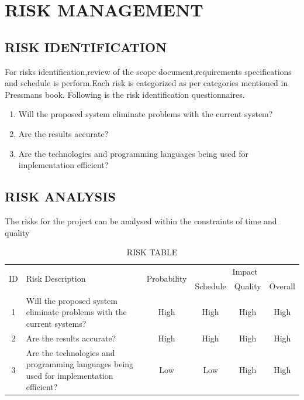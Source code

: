 \documentclass[oneside,a4paper,12pt]{report}
\begin{document}
\section{RISK MANAGEMENT}
\subsection{RISK IDENTIFICATION}
For risks identification,review of the scope document,requirements specifications and schedule is perform.Each risk is categorized as per categories mentioned in Pressmans book. Following is the risk identification questionnaires.
\begin{enumerate}
\item Will the proposed system eliminate problems with the current system?
\item Are the results accurate?
\item Are the technologies and programming languages being used for implementation efficient?
\end{enumerate}
\subsection{RISK ANALYSIS}
The risks for the project can be analysed within the constraints of time and quality
\begin{table}[!htbp]
\begin{center}
\def\arraystretch{1.5}
\begin{tabularx}{\textwidth}{| c | X | c | c | c | c |}
\hline
\multirow{2}{*}{ID} & \multirow{2}{*}{Risk Description}	& \multirow{2}{*}{Probability} & \multicolumn{3}{|c|}{Impact} \\ \cline{4-6}
	& & &	Schedule	& Quality	& Overall \\ \hline
1	& Will the proposed system eliminate problems with the
current systems? & High & High & High & High \\
 \hline
2	& Are the results accurate? & High & High & High & High \\ 
\hline
3 & Are the technologies and programming languages being used for implementation efficient? & Low & Low & High & High\\
\hline
\end{tabularx}
\end{center}
\caption{RISK TABLE}
\label{tab:RISK TABLE}
\end{table}
\end{document}
